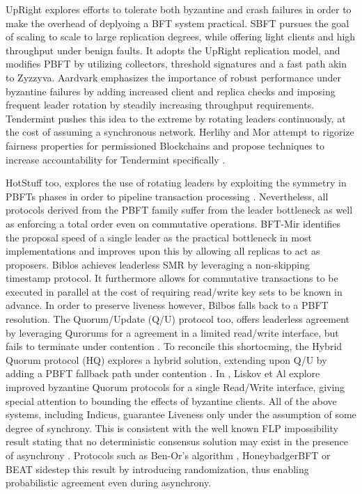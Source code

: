 UpRight \cite{Clement09Upright} explores efforts to tolerate both byzantine and crash failures in order to make the overhead of deplyoing a BFT system practical.
SBFT \cite{gueta2018sbft} pursues the goal of scaling to scale to large replication degrees, while offering light clients and high throughput under benign faults. It adopts the UpRight replication model, and modifies PBFT by utilizing collectors, threshold signatures and a fast path akin to Zyzzyva. 
Aardvark \cite{clement2009making} emphasizes the importance of robust performance under byzantine failures by adding increased client and replica checks and imposing frequent leader rotation by steadily increasing throughput requirements. Tendermint \cite{buchman2016tendermint} pushes this idea to the extreme by rotating leaders continuously, at the cost of assuming a synchronous network. Herlihy and Mor attempt to rigorize fairness properties for permissioned Blockchains and propose techniques to increase accountability for Tendermint specifically \cite{herlihy2016enhancing}.

HotStuff too, explores the use of rotating leaders by exploiting the symmetry in PBFTs phases in order to pipeline transaction processing \cite{yin2019hotstuff}. 
Nevertheless, all protocols derived from the PBFT family suffer from the leader bottleneck as well as enforcing a total order even on commutative operations. BFT-Mir \cite{stathakopoulou2019mir} identifies the proposal speed of a single leader as the practical bottleneck in most implementations and improves upon this by allowing all replicas to act as proposers.
Biblos \cite{bazzi2018clairvoyant} achieves leaderless SMR by leveraging a non-skipping timestamp protocol. It furthermore allows for commutative transactions to be executed in parallel at the cost of requiring read/write key sets to be known in advance. In order to preserve liveness however, Bilbos falls back to a PBFT resolution. 
The Quorum/Update (Q/U) protocol too, offers leaderless agreement by leveraging Qurorums for a agreement in a limited read/write interface, but fails to terminate under contention \cite{abd2005fault}. To reconcile this shortocming, the Hybrid Quorum protocol (HQ) explores a hybrid solution, extending upon Q/U by adding a PBFT fallback path under contention \cite{cowling2006hq}. In \cite{liskov2006tolerating}, Liskov et Al explore improved byzantine Quorum protocols for a single Read/Write interface, giving special attention to bounding the effects of byzantine clients. 
All of the above systems, including Indicus, guarantee Liveness only under the assumption of some degree of synchrony. This is consistent with the well known FLP impossibility result stating that no deterministic consensus solution may exist in the presence of asynchrony \cite{fischer1985impossibility}. Protocols such as Ben-Or's algorithm \cite{ben1983another}, HoneybadgerBFT \cite{miller2016honey} or BEAT \cite{duan2018beat} sidestep this result by introducing randomization, thus enabling probabilistic agreement even during asynchrony.

